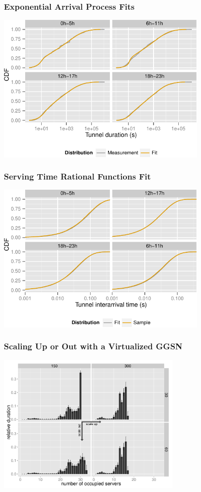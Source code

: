 \documentclass{beamer}
\begin{document}
\begin{frame}
	\frametitle{Exponential Arrival Process Fits}

	\begin{center}
		\includegraphics[height=7.5cm]{figures/timeslot-fits.pdf}
	\end{center}
\end{frame}

\begin{frame}
	\frametitle{Serving Time Rational Functions Fit}

	\begin{center}
		\includegraphics[height=7.5cm]{figures/R-IAT-active-fit-cdf-facets.pdf}
	\end{center}
\end{frame}

\begin{frame}
	\frametitle{Scaling Up or Out with a Virtualized GGSN}
	
	\begin{center}
		\includegraphics[height=7cm]{figures/resourceusedistribution-detail-barplot-annotated.pdf}
	\end{center}
\end{frame}
\end{document}
